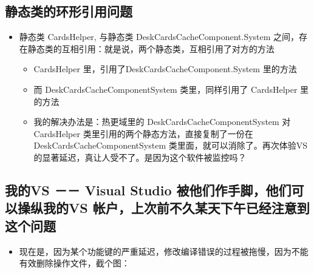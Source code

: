 \documentclass[9pt, b5paper]{article}
\begin{document}
\subsection{静态类的环形引用问题}
\label{sec:org54a508c}
\begin{itemize}
\item 静态类 CardsHelper, 与静态类 DeskCardsCacheComponent.System 之间，存在静态类的互相引用：就是说，两个静态类，互相引用了对方的方法
\begin{itemize}
\item CardsHelper 里，引用了DeskCardsCacheComponent.System 里的方法
\item 而 DeskCardsCacheComponentSystem 类里，同样引用了 CardsHelper 里的方法
\item 我的解决办法是：热更域里的 DeskCardsCacheComponentSystem 对CardsHelper 类里引用的两个静态方法，直接复制了一份在 DeskCardsCacheComponentSystem 类里面，就可以消除了。再次体验VS 的显著延迟，真让人受不了。是因为这个软件被监控吗？
\end{itemize}
\end{itemize}
\subsection{我的VS －－ Visual Studio 被他们作手脚，他们可以操纵我的VS 帐户，上次前不久某天下午已经注意到这个问题}
\label{sec:org0894a80}
\begin{itemize}
\item 现在是，因为某个功能键的严重延迟，修改编译错误的过程被拖慢，因为不能有效删除操作文件，截个图：
\end{itemize}
\end{document}
